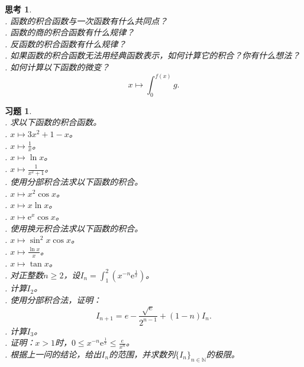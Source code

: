 \documentclass[12pt,UTF8]{ctexbook}
\theoremstyle{definition}
\theoremstyle{plain}
\newtheorem{sk}{思考}[section]
\newtheorem{xt}{习题}[section]
\begin{document}
\begin{sk}
    \mbox{} \\
    . 函数的积合函数与一次函数有什么共同点？ \\
    . 函数的商的积合函数有什么规律？\\
    . 反函数的积合函数有什么规律？\\
    . 如果函数的积合函数无法用经典函数表示，如何计算它的积合？你有什么想法？\\
    . 如何计算以下函数的微变？
    $$x\mapsto \int_0^{f(x)} g.$$
\end{sk}

\begin{xt}
    \mbox{} \\
    . 求以下函数的积合函数。\\
    . $x\mapsto 3x^2 + 1 - x$。\\
    . $x\mapsto \frac{1}{x}$。\\
    . $x\mapsto \ln{x}$。\\
    . $x\mapsto \frac{1}{x^2 + 1}$。\\
    . 使用分部积合法求以下函数的积合。\\
    . $x\mapsto x^2 \cos{x}$。 \\
    . $x\mapsto x \ln{x} $。 \\
    . $x\mapsto \mathrm{e}^x \cos{x} $。 \\
    . 使用换元积合法求以下函数的积合。\\
    . $x\mapsto \sin^2{x} \cos{x}$。 \\
    . $x\mapsto \frac{\ln{x}}{x} $。 \\
    . $x\mapsto \tan{x} $。 \\
    . 对正整数$n\geqslant 2$，设$I_n = \int_1^2 \left(x^{-n}\mathrm{e}^{\frac{1}{x}}\right)$。\\
    . 计算$I_2$。\\
    . 使用分部积合法，证明：
            $$ I_{n+1} = e - \frac{\sqrt{e}}{2^{n-1}} + (1 - n)I_n.$$
    . 计算$I_3$。\\
    . 证明：$x>1$时，$0\leqslant x^{-n}\mathrm{e}^{\frac{1}{x}} \leqslant \frac{e}{x^n}$。\\
    . 根据上一问的结论，给出$I_n$的范围，并求数列$\{I_n\}_{n\in\mathbb{N}}$的极限。
\end{xt}
\end{document}
